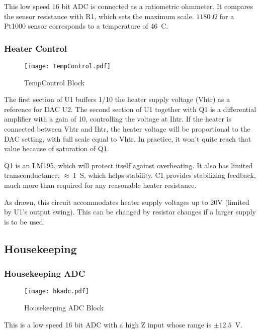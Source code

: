 \documentclass[a4paper,12pt]{article}
\begin{document}
This low speed 16 bit ADC is connected as a ratiometric ohmmeter. It compares the sensor resistance with R1, which sets the maximum scale. $1180\ \Omega$ for a Pt1000 sensor corresponds to a temperature of 46\ C.

\subsubsection{Heater Control}
   \begin{figure}
   \begin{center}
   \texttt{[image: TempControl.pdf]}
   \end{center}
   \caption{TempControl Block}
   \end{figure}

The first section of U1 buffers 1/10 the heater supply voltage (Vhtr) as a reference for DAC U2. The second section of U1 together with Q1 is a differential amplifier with a gain of 10, controlling the voltage at Ihtr.  If the heater is connected between Vhtr and Ihtr, the heater voltage will be proportional to the DAC setting, with full scale equal to Vhtr. In practice, it won't quite reach that value because of saturation of Q1.

Q1 is an LM195, which will protect itself against overheating. It also has limited transconductance, $\approx\ 1$\ S, which helps stability. C1 provides stabilizing feedback, much more than required for any reasonable heater resistance.

As drawn, this circuit accommodates heater supply voltages up to 20V (limited by U1's output swing). This can be changed by resistor changes if a larger supply is to be used.

\subsection{Housekeeping}

\subsubsection{Housekeeping ADC}
   \begin{figure}
   \begin{center}
   \texttt{[image: hkadc.pdf]}
   \end{center}
   \caption{Housekeeping ADC Block}
   \end{figure}

This is a low speed 16 bit ADC with a high Z input whose range is $\pm 12.5$\ V.
\end{document}
